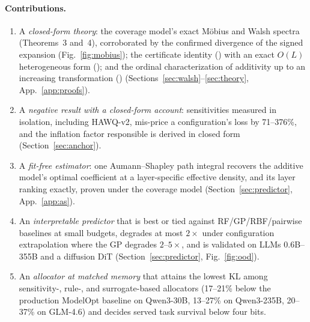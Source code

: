\paragraph{Contributions.}
\begin{enumerate}
\item A \textit{closed-form theory}: the coverage model's exact M\"obius and Walsh spectra
  (Theorems~3 and~4), corroborated by the confirmed divergence of the signed expansion
  (Fig.~\ref{fig:mobius}); the certificate identity (\thmone) with an exact $O(L)$ heterogeneous form
  (\propfive); and the ordinal characterization of additivity up to an increasing transformation
  (\thmtwo)
  (Sections~\ref{sec:walsh}--\ref{sec:theory}, App.~\ref{app:proofs}).
\item A \textit{negative result with a closed-form account}: sensitivities measured in isolation,
  including HAWQ-v2, mis-price a configuration's loss by 71--376\%, and the inflation factor
  responsible is derived in closed form (Section~\ref{sec:anchor}).
\item A \textit{fit-free estimator}: one Aumann--Shapley path integral recovers the additive model's
  optimal coefficient at a layer-specific effective density, and its layer ranking exactly, proven
  under the coverage model (Section~\ref{sec:predictor}, App.~\ref{app:as}).
\item An \textit{interpretable predictor} that is best or tied against RF/GP/RBF/pairwise baselines at
  small budgets, degrades at most $2\times$ under configuration extrapolation where the GP
  degrades
  $2$--$5\times$, and is validated on LLMs 0.6B--355B and a diffusion DiT
  (Section~\ref{sec:predictor}, Fig.~\ref{fig:ood}).
\item An \textit{allocator at matched memory} that attains the lowest KL among sensitivity-, rule-,
  and surrogate-based allocators (17--21\% below the production ModelOpt baseline on Qwen3-30B,
  13--27\% on Qwen3-235B, 20--37\% on GLM-4.6) and decides served task survival below four bits.
\end{enumerate}


